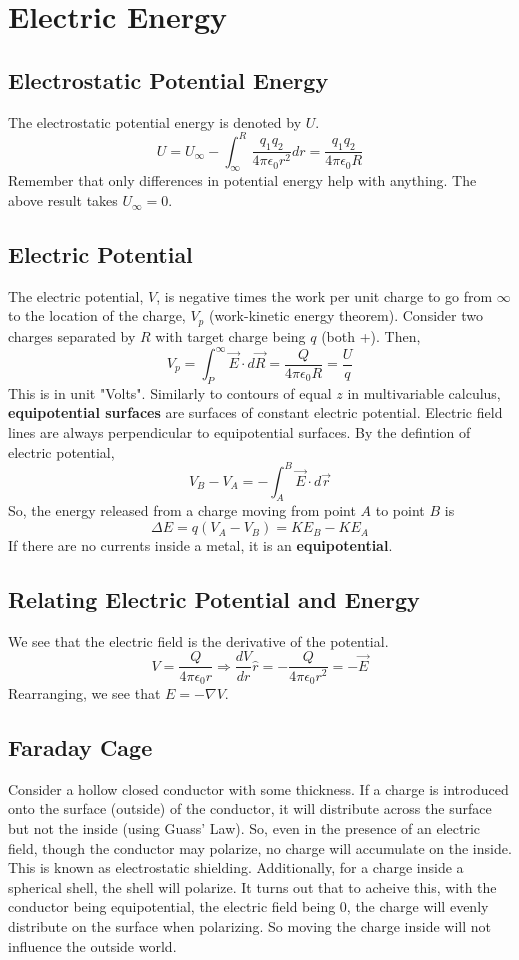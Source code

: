 \documentclass{article}
\begin{document}
\section{Electric Energy}
\subsection{Electrostatic Potential Energy}
The electrostatic potential energy is denoted by $U$.
$$U=U_{\infty}-\int_{\infty}^{R}\frac{q_{1}q_{2}}{4\pi\epsilon_{0}r^{2}}dr
=\frac{q_{1}q_{2}}{4\pi\epsilon_{0}R}$$
Remember that only differences in potential energy help with anything. The above 
result takes $U_{\infty}=0$.

\subsection{Electric Potential}
The electric potential, $V$, is negative times the work per unit charge to go from $\infty$
to the location of the charge, $V_{p}$ (work-kinetic energy theorem). Consider two charges separated by $R$
with target charge being $q$ (both +). Then,
$$V_{p}=\int_{P}^{\infty}\vec{E}\cdot d\vec{R}=\frac{Q}{4\pi\epsilon_{0}R}=\frac{U}{q}$$
This is in unit "Volts". Similarly to contours of equal $z$ in multivariable calculus, 
\textbf{equipotential surfaces} are surfaces of constant electric potential. Electric field 
lines are always perpendicular to equipotential surfaces. By the defintion of electric potential,
$$V_{B}-V_{A}=-\int_{A}^{B}\vec{E}\cdot d\vec{r}$$
So, the energy released from a charge moving from point $A$ to point $B$ is
$$\Delta E=q(V_{A}-V_{B})=KE_{B}-KE_{A}$$
If there are no currents inside a metal, it is an \textbf{equipotential}.

\subsection{Relating Electric Potential and Energy}
We see that the electric field is the derivative of the potential.
$$V=\frac{Q}{4\pi\epsilon_{0}r} \Rightarrow
\frac{dV}{dr}\hat{r}=-\frac{Q}{4\pi\epsilon_{0}r^{2}}=-\vec{E}$$
Rearranging, we see that $E=-\nabla V$.

\subsection{Faraday Cage}
Consider a hollow closed conductor with some thickness. If a charge is introduced onto the surface (outside) of the
conductor, it will distribute across the surface but not the inside (using Guass' Law). So,
even in the presence of an electric field, though the conductor may polarize, no charge will accumulate 
on the inside. This is known as electrostatic shielding. Additionally, for a charge inside a spherical shell,
the shell will polarize. It turns out that to acheive this, with the conductor being equipotential, the electric field
being $0$, the charge will evenly distribute on the surface when polarizing. So moving the charge inside will not 
influence the outside world.
\end{document}
